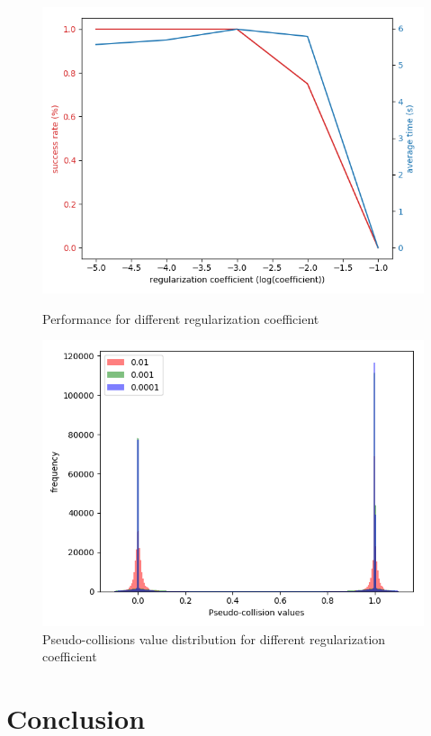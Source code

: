 \documentclass{article}
\begin{document}
\begin{figure}[t]
    \centering
    \begin{minipage}{.5\textwidth}
        \centering
        \includegraphics[width=\textwidth]{reg_coeff}
        \caption{Performance for different regularization coefficient}
        \label{fig:regcoeff}
    \end{minipage}%
    \begin{minipage}{.5\textwidth}
        \centering
        \includegraphics[width=\textwidth]{data_distribution}
        \caption{Pseudo-collisions value distribution for different regularization coefficient} 
        \label{fig:datadist}
    \end{minipage}
\end{figure}


\section{Conclusion}


 
\end{document}
